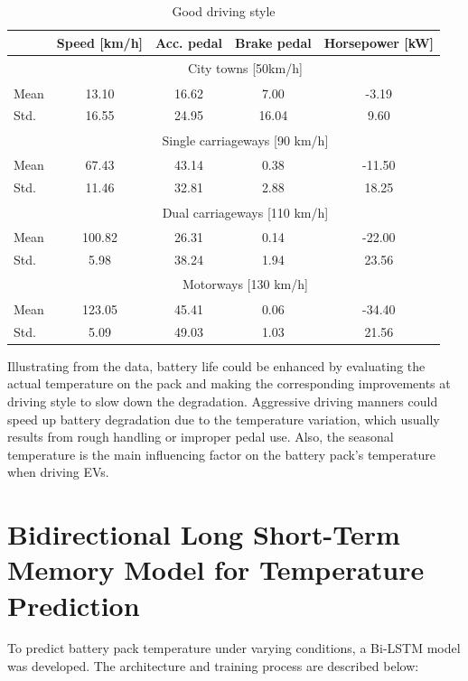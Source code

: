 \begin{table}[!ht]
    \centering
    \caption{Good driving style}
        \begin{tabular}{l|c|c|c|c}
        \label{table:good_driving_style}
        ~ & Speed [km/h] & Acc. pedal & Brake pedal & Horsepower [kW]\\ \hline
        ~ & \multicolumn{4}{c}{\multirow{2}{*}{City towns [50km/h]}} \\\\ \hline
        Mean & 13.10 & 16.62 & 7.00 & -3.19\\
        Std. & 16.55 & 24.95 & 16.04 &9.60\\ \hline
        ~ & \multicolumn{4}{c}{\multirow{2}{*}{Single carriageways [90 km/h]}} \\\\ \hline
        Mean & 67.43 & 43.14 & 0.38 & -11.50\\
        Std. & 11.46 & 32.81 & 2.88 & 18.25\\ \hline
        ~ & \multicolumn{4}{c}{\multirow{2}{*}{Dual carriageways [110 km/h]}} \\\\ \hline
        Mean & 100.82 & 26.31 & 0.14 & -22.00\\
        Std. & 5.98 & 38.24 & 1.94 & 23.56\\ \hline
        ~ & \multicolumn{4}{c}{\multirow{2}{*}{Motorways [130 km/h]}} \\\\ \hline
        Mean & 123.05 & 45.41 & 0.06 & -34.40\\
        Std. & 5.09 & 49.03 & 1.03 & 21.56\\
        \hline
        \end{tabular}
\end{table}

Illustrating from the data, battery life could be enhanced by evaluating the actual temperature on the pack and making the corresponding improvements at driving style to slow down the degradation. 
Aggressive driving manners could speed up battery degradation due to the temperature variation, which usually results from rough handling or improper pedal use. 
Also, the seasonal temperature is the main influencing factor on the battery pack's temperature when driving \glspl{EV}.

\section{Bidirectional Long Short-Term Memory Model for Temperature Prediction}
To predict battery pack temperature under varying conditions, a \gls{Bi-LSTM} model was developed. The architecture and training process are described below:

